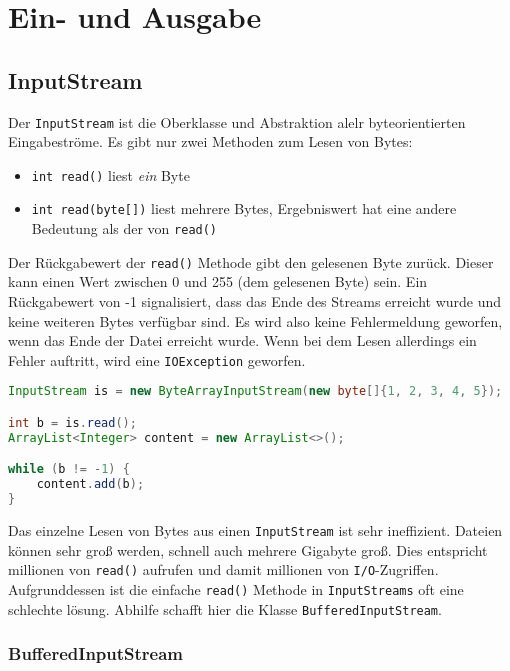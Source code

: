 \chapter{Ein- und Ausgabe}

\section{InputStream}
\label{inputstream}

Der \lstinline{InputStream} ist die Oberklasse und Abstraktion alelr
byteorientierten Eingabeströme. Es gibt nur zwei Methoden zum Lesen von Bytes:
\begin{itemize}
    \item \lstinline{int read()} liest \textit{ein} Byte
    \item \lstinline{int read(byte[])} liest mehrere Bytes, Ergebniswert hat eine andere
          Bedeutung als der von \lstinline{read()}
\end{itemize}

Der Rückgabewert der \lstinline{read()} Methode gibt den gelesenen Byte zurück.
Dieser kann einen Wert zwischen 0 und 255 (dem gelesenen Byte) sein. Ein
Rückgabewert von -1 signalisiert, dass das Ende des Streams erreicht wurde und
keine weiteren Bytes verfügbar sind. Es wird also keine Fehlermeldung geworfen,
wenn das Ende der Datei erreicht wurde. Wenn bei dem Lesen allerdings ein
Fehler auftritt, wird eine \lstinline{IOException} geworfen.

\begin{lstlisting}[language=Java, caption={Beispiel für InputStream}]
InputStream is = new ByteArrayInputStream(new byte[]{1, 2, 3, 4, 5});

int b = is.read();
ArrayList<Integer> content = new ArrayList<>();

while (b != -1) {
    content.add(b);
}
\end{lstlisting}

Das einzelne Lesen von Bytes aus einen \lstinline{InputStream} ist sehr
ineffizient. Dateien können sehr groß werden, schnell auch mehrere Gigabyte
groß. Dies entspricht millionen von \lstinline{read()} aufrufen und damit
millionen von \texttt{I/O}-Zugriffen. Aufgrunddessen ist die einfache
\lstinline{read()} Methode in \lstinline{InputStreams} oft eine schlechte
lösung. Abhilfe schafft hier die Klasse \lstinline{BufferedInputStream}.

\subsection{BufferedInputStream}

